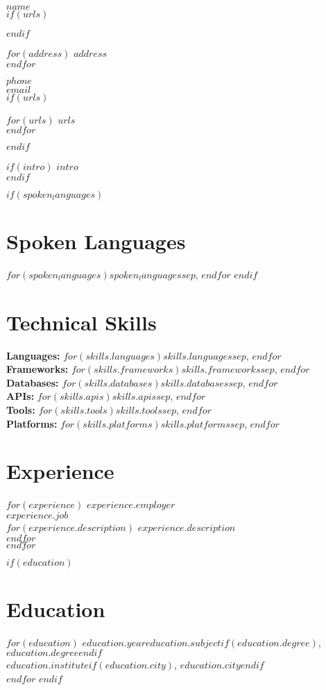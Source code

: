 \documentclass[$fontsize$, a4paper]{article}
\newcommand{\note}[1]{\marginnote{\scriptsize #1}}
\begin{document}
{\LARGE $name$}\\[.2cm]

$if(urls)$
\begin{multicols}{2}
$endif$

$for(address)$
$address$\\
$endfor$

\vspace{-10pt}

$phone$\\
\href{mailto:$email$}{$email$}\\


$if(urls)$
\columnbreak

$for(urls)$
\href{http://$urls$}{$urls$}\\
$endfor$
\end{multicols}
$endif$

\vspace{30pt}

$if(intro)$
{$intro$}\\[.2cm]
$endif$


$if(spoken_languages)$
\section*{Spoken Languages}
\noindent
$for(spoken_languages)$$spoken_languages$$sep$, $endfor$
\vspace{20pt}
$endif$


\section*{Technical Skills}
\noindent
\textbf{Languages:} $for(skills.languages)$$skills.languages$$sep$, $endfor$\\[6pt]
\textbf{Frameworks:} $for(skills.frameworks)$$skills.frameworks$$sep$, $endfor$\\[6pt]
\textbf{Databases:} $for(skills.databases)$$skills.databases$$sep$, $endfor$\\[6pt]
\textbf{APIs:} $for(skills.apis)$$skills.apis$$sep$, $endfor$\\[6pt]
\textbf{Tools:} $for(skills.tools)$$skills.tools$$sep$, $endfor$\\[6pt]
\textbf{Platforms:} $for(skills.platforms)$$skills.platforms$$sep$, $endfor$


\vspace{25pt}

\section*{Experience}
\noindent
$for(experience)$
\note{$experience.years$}\textsc{$experience.employer$}\\
  \emph{$experience.job$}\\
  $for(experience.description)$
    $experience.description$\\
  $endfor$\\[.2cm]
$endfor$

$if(education)$
\section*{Education}
\noindent
$for(education)$
  \textbf{$education.year$}\quad \textbf{$education.subject$}$if(education.degree)$, $education.degree$$endif$\\
  \emph{$education.institute$}$if(education.city)$, $education.city$$endif$\\[.2cm]
$endfor$
$endif$
\end{document}
